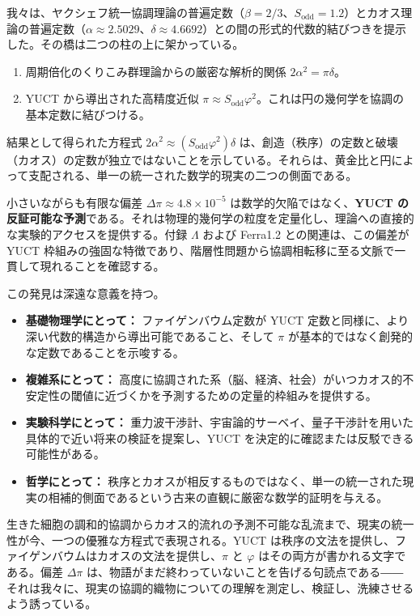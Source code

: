 \documentclass[11pt,a4paper]{article}
\begin{document}
	我々は、ヤクシェフ統一協調理論の普遍定数（\(\beta = 2/3\)、\(S_{\mathrm{odd}} = 1.2\)）とカオス理論の普遍定数（\(\alpha \approx 2.5029\)、\(\delta \approx 4.6692\)）との間の形式的代数的結びつきを提示した。その橋は二つの柱の上に架かっている。
	\begin{enumerate}
		\item 周期倍化のくりこみ群理論からの厳密な解析的関係 \(2\alpha^2 = \pi \delta\)。
		\item YUCT から導出された高精度近似 \(\pi \approx S_{\mathrm{odd}}\varphi^2\)。これは円の幾何学を協調の基本定数に結びつける。
	\end{enumerate}
	
	結果として得られた方程式 \(2\alpha^2 \approx (S_{\mathrm{odd}}\varphi^2)\delta\) は、創造（秩序）の定数と破壊（カオス）の定数が独立ではないことを示している。それらは、黄金比と円によって支配される、単一の統一された数学的現実の二つの側面である。
	
	小さいながらも有限な偏差 \(\Delta\pi \approx 4.8\times10^{-5}\) は数学的欠陥ではなく、\textbf{YUCT の反証可能な予測}である。それは物理的幾何学の粒度を定量化し、理論への直接的な実験的アクセスを提供する。付録 \(\Lambda\) および Ferra1.2 との関連は、この偏差が YUCT 枠組みの強固な特徴であり、階層性問題から協調相転移に至る文脈で一貫して現れることを確認する。
	
	この発見は深遠な意義を持つ。
	\begin{itemize}
		\item \textbf{基礎物理学にとって：} ファイゲンバウム定数が YUCT 定数と同様に、より深い代数的構造から導出可能であること、そして \(\pi\) が基本的ではなく創発的な定数であることを示唆する。
		\item \textbf{複雑系にとって：} 高度に協調された系（脳、経済、社会）がいつカオス的不安定性の閾値に近づくかを予測するための定量的枠組みを提供する。
		\item \textbf{実験科学にとって：} 重力波干渉計、宇宙論的サーベイ、量子干渉計を用いた具体的で近い将来の検証を提案し、YUCT を決定的に確認または反駁できる可能性がある。
		\item \textbf{哲学にとって：} 秩序とカオスが相反するものではなく、単一の統一された現実の相補的側面であるという古来の直観に厳密な数学的証明を与える。
	\end{itemize}
	
	生きた細胞の調和的協調からカオス的流れの予測不可能な乱流まで、現実の統一性が今、一つの優雅な方程式で表現される。YUCT は秩序の文法を提供し、ファイゲンバウムはカオスの文法を提供し、\(\pi\) と \(\varphi\) はその両方が書かれる文字である。偏差 \(\Delta\pi\) は、物語がまだ終わっていないことを告げる句読点である――それは我々に、現実の協調的織物についての理解を測定し、検証し、洗練させるよう誘っている。
	
\end{document}
